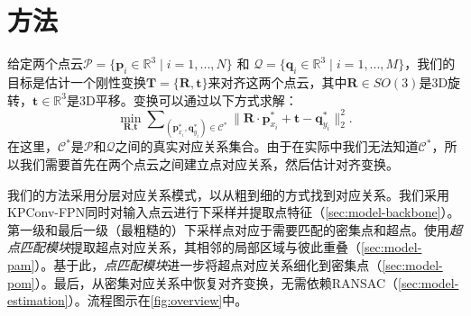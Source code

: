 %
%
%
%
%
%


\chapter{方法}
\label{sec:geotrans}



给定两个点云$\mathcal{P} = \{\textbf{p}_i \in \mathbb{R}^3 \mid i = 1, ..., N\}$ 和 $\mathcal{Q} = \{\textbf{q}_i \in \mathbb{R}^3 \mid i = 1, ..., M\}$，我们的目标是估计一个刚性变换$\textbf{T} = \{\textbf{R}, \textbf{t}\}$来对齐这两个点云，其中$\textbf{R} \in SO(3)$是3D旋转，$\textbf{t} \in \mathbb{R}^3$是3D平移。变换可以通过以下方式求解：
\begin{equation}
\min_{\textbf{R}, \textbf{t}} \sum\nolimits_{(\textbf{p}^{*}_{x_i}, \textbf{q}^{*}_{y_i}) \in \mathcal{C}^{*}} \lVert \textbf{R} \cdot \textbf{p}^{*}_{x_i} + \textbf{t} - \textbf{q}^{*}_{y_i} \rVert^2_2.
\end{equation}
在这里，$\mathcal{C}^{*}$是$\mathcal{P}$和$\mathcal{Q}$之间的真实对应关系集合。由于在实际中我们无法知道$\mathcal{C}^{*}$，所以我们需要首先在两个点云之间建立点对应关系，然后估计对齐变换。

我们的方法采用分层对应关系模式，以从粗到细的方式找到对应关系。我们采用KPConv-FPN同时对输入点云进行下采样并提取点特征（\ref{sec:model-backbone}）。第一级和最后一级（最粗糙的）下采样点对应于需要匹配的密集点和超点。使用\emph{超点匹配模块}提取超点对应关系，其相邻的局部区域与彼此重叠（\ref{sec:model-pam}）。基于此，\emph{点匹配模块}进一步将超点对应关系细化到密集点（\ref{sec:model-pom}）。最后，从密集对应关系中恢复对齐变换，无需依赖RANSAC（\ref{sec:model-estimation}）。流程图示在\ref{fig:overview}中。

